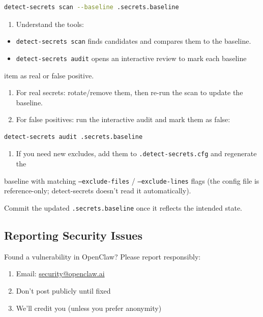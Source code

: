 \begin{lstlisting}[language=bash]
   detect-secrets scan --baseline .secrets.baseline
\end{lstlisting}


\begin{enumerate}
  \item Understand the tools:
\end{enumerate}

\begin{itemize}
  \item \texttt{detect-secrets scan} finds candidates and compares them to the baseline.
  \item \texttt{detect-secrets audit} opens an interactive review to mark each baseline
\end{itemize}

item as real or false positive.
\begin{enumerate}
  \item For real secrets: rotate/remove them, then re-run the scan to update the baseline.
  \item For false positives: run the interactive audit and mark them as false:
\end{enumerate}


\begin{lstlisting}[language=bash]
   detect-secrets audit .secrets.baseline
\end{lstlisting}


\begin{enumerate}
  \item If you need new excludes, add them to \texttt{.detect-secrets.cfg} and regenerate the
\end{enumerate}

baseline with matching \texttt{--exclude-files} / \texttt{--exclude-lines} flags (the config
file is reference-only; detect-secrets doesn’t read it automatically).

Commit the updated \texttt{.secrets.baseline} once it reflects the intended state.

\subsection{Reporting Security Issues}


Found a vulnerability in OpenClaw? Please report responsibly:

\begin{enumerate}
  \item Email: \href{mailto:security@openclaw.ai}{security@openclaw.ai}
  \item Don't post publicly until fixed
  \item We'll credit you (unless you prefer anonymity)
\end{enumerate}




